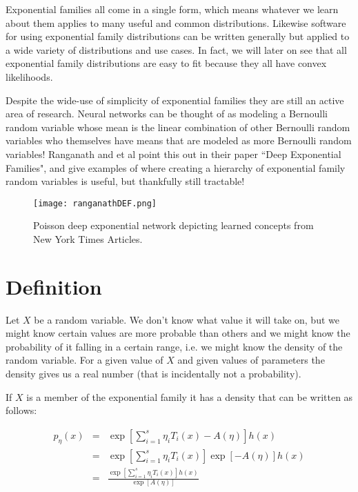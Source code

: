 \documentclass[oneside]{article}
\begin{document}
Exponential families all come in a single form, which means whatever we learn about them applies to many useful and common distributions. Likewise software for using exponential family distributions can be written generally but applied to a wide variety of distributions and use cases. In fact, we will later on see that all exponential family distributions are easy to fit because they all have convex likelihoods. 

Despite the wide-use of simplicity of exponential families they are still an active area of research. Neural networks can be thought of as modeling a Bernoulli random variable whose mean is the linear combination of other Bernoulli random variables who themselves have means that are modeled as more Bernoulli random variables! Ranganath and et al point this out in their paper ``Deep Exponential Families", and give examples of where creating a hierarchy of exponential family random variables is useful, but thankfully still tractable! 

\begin{figure}[!ht]
\label{fig:ranganathDEF}
  \centering
    \texttt{[image: ranganathDEF.png]}
   \caption{Poisson deep exponential network depicting learned concepts from New York Times Articles.}
\end{figure}

\section{Definition}
Let $X$ be a random variable. We don't know what value it will take on, but we might know certain values are more probable than others and we might know the probability of it falling in a certain range, i.e. we might know the density of the random variable. For a given value of $X$ and given values of parameters the density gives us a real number (that is incidentally not a probability).

If $X$ is a member of the exponential family it has a density that can be written as follows:

\begin{eqnarray}
p_\eta(x) &=& \exp \left[ \sum_{i=1}^s \eta_i T_i(x) - A(\eta) \right] h(x)\\
&=& \exp \left[ \sum_{i=1}^s \eta_i T_i(x) \right]  \exp \left[ - A(\eta) \right] h(x)\nonumber\\
&=& \frac{\exp \left[ \sum_{i=1}^s \eta_i T_i(x) \right] h(x)}{\exp \left[A(\eta) \right]}
\end{eqnarray}
\end{document}
